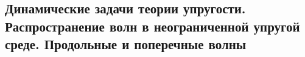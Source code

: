 

\subsection{Динамические задачи теории упругости. Распространение волн в неограниченной упругой среде. Продольные и поперечные волны}



